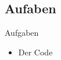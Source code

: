\subsection{Aufaben}
\begin{frame}{Aufgaben}
 \begin{itemize}
  \item Der Code 
 \end{itemize}
\end{frame}
